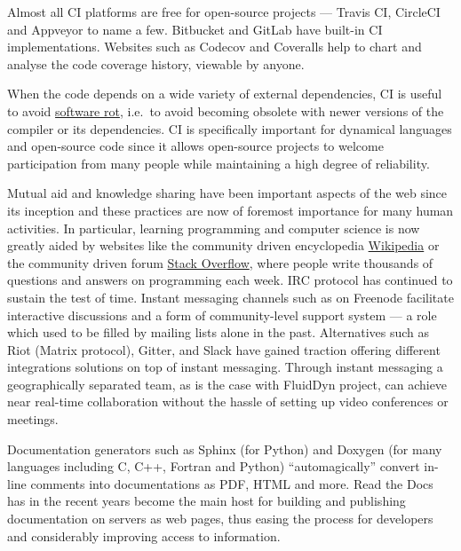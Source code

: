 Almost all CI platforms are free for open-source projects --- Travis CI,
CircleCI and Appveyor %
to name a few. Bitbucket and GitLab have built-in CI
implementations.  Websites such as Codecov and Coveralls help to chart and
analyse the code coverage history, viewable by anyone.

When the code depends on a wide variety of external dependencies, CI is useful
to avoid \href{https://en.wikipedia.org/wiki/Software\_rot}{software rot},
i.e.\ to avoid becoming obsolete with newer versions of the compiler or its
dependencies.  CI is specifically important for dynamical
languages and open-source code since it allows open-source projects to welcome
participation from many people while maintaining a high degree of reliability.

 Mutual aid and knowledge sharing
have been important aspects of the web since its inception and these practices
are now of foremost importance for many human activities.
%
In particular, learning programming and computer science is now greatly aided
by websites like the community driven encyclopedia
\href{https://www.wikipedia.org/}{Wikipedia} or the community driven forum
\href{https://stackoverflow.com/}{Stack Overflow}, where people write thousands
of questions and answers on programming each week.
IRC protocol has continued to sustain the test of time. Instant messaging
channels such as  on Freenode facilitate interactive
discussions and a form of community-level support system --- a role which used
to be filled by mailing lists alone in the past. Alternatives such as Riot
(Matrix protocol), Gitter, and Slack have gained traction offering different
integrations solutions on top of instant messaging.
%
Through instant messaging a geographically separated team, as is the case with
FluidDyn project, can achieve near real-time collaboration without the hassle
of setting up video conferences or meetings.

 Documentation
generators such as Sphinx (for Python) and Doxygen (for many languages
including C, C++, Fortran and Python) ``automagically'' convert in-line
comments into documentations as PDF, HTML and more. Read the Docs has in the
recent years become the main host for building and publishing documentation on
servers as web pages, thus easing the process for developers and considerably
improving access to information.

